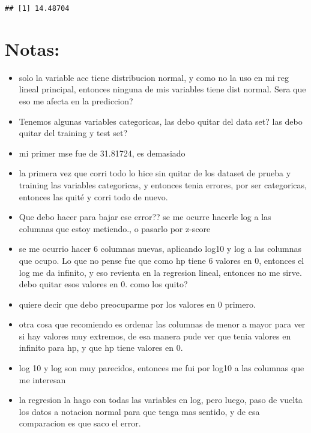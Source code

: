 \documentclass[]{article}
\begin{document}
\begin{verbatim}
## [1] 14.48704
\end{verbatim}

\hypertarget{notas}{%
\section{Notas:}\label{notas}}

\begin{itemize}
\item
  solo la variable acc tiene distribucion normal, y como no la uso en mi
  reg lineal principal, entonces ninguna de mis variables tiene dist
  normal. Sera que eso me afecta en la prediccion?
\item
  Tenemos algunas variables categoricas, las debo quitar del data set?
  las debo quitar del training y test set?
\item
  mi primer mse fue de 31.81724, es demasiado
\item
  la primera vez que corri todo lo hice sin quitar de los dataset de
  prueba y training las variables categoricas, y entonces tenia errores,
  por ser categoricas, entonces las quité y corri todo de nuevo.
\item
  Que debo hacer para bajar ese error?? se me ocurre hacerle log a las
  columnas que estoy metiendo., o pasarlo por z-score
\item
  se me ocurrio hacer 6 columnas nuevas, aplicando log10 y log a las
  columnas que ocupo. Lo que no pense fue que como hp tiene 6 valores en
  0, entonces el log me da infinito, y eso revienta en la regresion
  lineal, entonces no me sirve. debo quitar esos valores en 0. como los
  quito?
\item
  quiere decir que debo preocuparme por los valores en 0 primero.
\item
  otra cosa que recomiendo es ordenar las columnas de menor a mayor para
  ver si hay valores muy extremos, de esa manera pude ver que tenia
  valores en infinito para hp, y que hp tiene valores en 0.
\item
  log 10 y log son muy parecidos, entonces me fui por log10 a las
  columnas que me interesan
\item
  la regresion la hago con todas las variables en log, pero luego, paso
  de vuelta los datos a notacion normal para que tenga mas sentido, y de
  esa comparacion es que saco el error.
\end{itemize}
\end{document}
